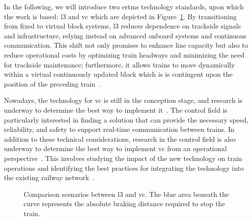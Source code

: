 \begin{comment}
	The CCS TSI (Command Control and Signalling - Technical Specification for Interoperability) has already defined \gls{l3}, and operational applications of the system already exist. \gls{l3}, as specified by the CCS TSI Subset-026~\cite{subset026}, is a train control system that utilizes radio communication to generate \glspl{ma} trackside and transmit them to the train via Euroradio communication protocol; moreover, provides continuous speed supervision to prevent any potential overrun of the authority~\cite{l3}.
\end{comment}


In the following, we will introduce two \gls{ertms} technology standards, upon which the work is based: \gls{l3} and \gls{vc} which are depicted in Figure~\ref{fig:ertmsl3vc}.
By transitioning from fixed to virtual block systems, \gls{l3} reduces dependence on trackside signals and infrastructure, relying instead on advanced onboard systems and continuous  communication. This shift not only promises to enhance line capacity but also to reduce operational costs by optimizing train headways and minimizing the need for trackside maintenance; furthermore, it allows trains to move dynamically within a virtual continuously updated block which is is contingent upon the position of the preceding train~\cite{ertmsl3}.  


Nowadays, the technology for \gls{vc} is still in the conception stage, and research is underway to determine the best way to implement it~\cite{flamini2018}. The control field is particularly interested in finding a solution that can provide the necessary speed, reliability, and safety to support real-time communication between trains. In addition to these technical considerations, research in the control field is also underway to determine the best way to implement \gls{vc} from an operational perspective~\cite{dimeo2020}. This involves studying the impact of the new technology on train operations and identifying the best practices for integrating the technology into the existing railway network~\cite{ertmsl4}.



\begin{figure}[!ht]
	\resizebox{\linewidth}{!}{}
	\caption{Comparison scenarios between \gls{l3} and \gls{vc}.
		The blue area beneath the curve represents the absolute braking distance required to stop the train.}
	\label{fig:ertmsl3vc}
\end{figure}

